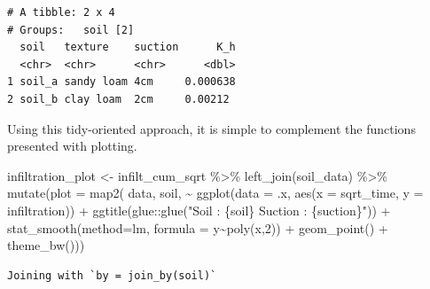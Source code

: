 \documentclass[
]{article}
\newenvironment{Shaded}{\begin{snugshade}}{\end{snugshade}}
\newcommand{\AttributeTok}[1]{\textcolor[rgb]{0.40,0.45,0.13}{#1}}
\newcommand{\DecValTok}[1]{\textcolor[rgb]{0.68,0.00,0.00}{#1}}
\newcommand{\FunctionTok}[1]{\textcolor[rgb]{0.28,0.35,0.67}{#1}}
\newcommand{\NormalTok}[1]{\textcolor[rgb]{0.00,0.23,0.31}{#1}}
\newcommand{\OtherTok}[1]{\textcolor[rgb]{0.00,0.23,0.31}{#1}}
\newcommand{\SpecialCharTok}[1]{\textcolor[rgb]{0.37,0.37,0.37}{#1}}
\newcommand{\StringTok}[1]{\textcolor[rgb]{0.13,0.47,0.30}{#1}}
\begin{document}
\begin{verbatim}
# A tibble: 2 x 4
# Groups:   soil [2]
  soil   texture    suction      K_h
  <chr>  <chr>      <chr>      <dbl>
1 soil_a sandy loam 4cm     0.000638
2 soil_b clay loam  2cm     0.00212 
\end{verbatim}

Using this tidy-oriented approach, it is simple to complement the
functions presented with plotting.

\begin{Shaded}
\begin{Highlighting}[]
\NormalTok{infiltration\_plot }\OtherTok{\textless{}{-}} 
\NormalTok{infilt\_cum\_sqrt }\SpecialCharTok{\%\textgreater{}\%} 
  \FunctionTok{left\_join}\NormalTok{(soil\_data) }\SpecialCharTok{\%\textgreater{}\%} 
  \FunctionTok{mutate}\NormalTok{(}\AttributeTok{plot =} \FunctionTok{map2}\NormalTok{(}
\NormalTok{    data, soil, }
    \SpecialCharTok{\textasciitilde{}} \FunctionTok{ggplot}\NormalTok{(}\AttributeTok{data =}\NormalTok{ .x, }\FunctionTok{aes}\NormalTok{(}\AttributeTok{x =}\NormalTok{ sqrt\_time, }\AttributeTok{y =}\NormalTok{ infiltration)) }\SpecialCharTok{+}
      \FunctionTok{ggtitle}\NormalTok{(glue}\SpecialCharTok{::}\FunctionTok{glue}\NormalTok{(}\StringTok{"Soil : \{soil\}}
\StringTok{                   Suction : \{suction\}"}\NormalTok{)) }\SpecialCharTok{+}
      \FunctionTok{stat\_smooth}\NormalTok{(}\AttributeTok{method=}\StringTok{\textquotesingle{}lm\textquotesingle{}}\NormalTok{, }\AttributeTok{formula =}\NormalTok{ y}\SpecialCharTok{\textasciitilde{}}\FunctionTok{poly}\NormalTok{(x,}\DecValTok{2}\NormalTok{)) }\SpecialCharTok{+}
      \FunctionTok{geom\_point}\NormalTok{() }\SpecialCharTok{+}
      \FunctionTok{theme\_bw}\NormalTok{()))}
\end{Highlighting}
\end{Shaded}

\begin{verbatim}
Joining with `by = join_by(soil)`
\end{verbatim}

\begin{Shaded}
\end{Shaded}
\end{document}
